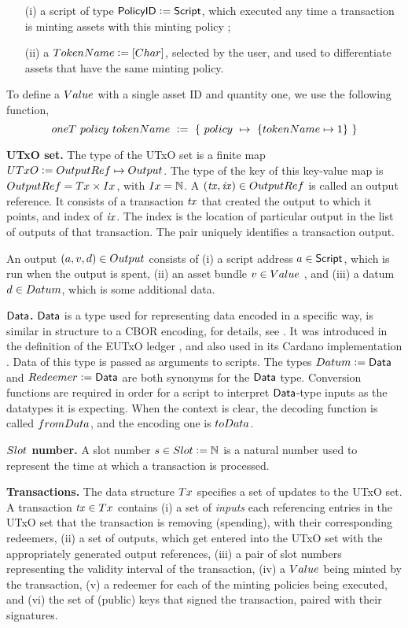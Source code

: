\begin{itemize}
  \item[(i)] a script of type $\textsf{PolicyID} \mathrel{\mathop:}= \textsf{Script}$, which executed any time a transaction is minting
  assets with this minting policy ;
  \item[(ii)] a $\TokenName \leteq [\type{Char}]$, selected by the user, and used to differentiate
  assets that have the same minting policy.
\end{itemize}

To define a $\Value$ with a single asset ID and quantity one, we use the following
function,
\[ \fun{oneT}~\fun{policy}~\fun{tokenName}~ \leteq~ \{~\fun{policy}~\mapsto~\{ \fun{tokenName} \mapsto 1 \}~\} \]

\textbf{UTxO set. } The type of the UTxO set is a finite map $\UTxO \leteq \OutputRef \mapsto \Output$.
The type of the key of this key-value map is $\OutputRef = \Tx \times \Ix$, with $\Ix = \N$.
A $(\var{tx}, \var{ix}) \in \OutputRef$ is called an output reference. It consists of a
transaction $\mathit{tx}$ that
created the output to which it points, and index of $\mathit{ix}$.
The index is the location of particular output in the list of outputs
of that transaction. The pair uniquely identifies a transaction
output.

An output $(a, v, d) \in \Output$ consists of (i) a script address $a \in \textsf{Script}$,
which is run when the output is spent, (ii) an asset bundle $v \in \Value$ , and
(iii) a datum $d \in \Datum$, which is some additional data.

\textbf{$\textsf{Data}$. } $\textsf{Data}$ is a type used for representing data encoded in a specific
way, is similar in structure to a CBOR encoding, for details, see \cite{agdaspeceutxo}.
It was introduced in the definition of
the EUTxO ledger \cite{eutxoma}, and also used in its Cardano implementation \cite{cardano}.
Data of this type is passed as arguments to scripts.
The types $\Datum \leteq \Data$ and $\Redeemer \leteq \Data$
are both synonyms for the $\textsf{Data}$ type. Conversion functions are required in order
for a script to interpret $\textsf{Data}$-type inputs as the datatypes it is expecting.
When the context is clear, the decoding
function is called $\fun{fromData}$, and the encoding one is $\fun{toData}$.

\textbf{$\Slot$ number. }  A slot number $s \in \Slot \leteq \N$ is a natural
number used to represent the time at which a transaction is processed.

\textbf{Transactions. } The data structure $\Tx$ specifies
a set of updates to the UTxO set. A transaction $\var{tx} \in \Tx$
contains (i) a set of \emph{inputs} each referencing entries in the UTxO set that the transaction
is removing (spending), with their corresponding redeemers, (ii) a set of outputs, which get entered into the
UTxO set with the appropriately generated output references, (iii) a pair of slot
numbers representing the validity interval of the transaction, (iv) a $\Value$ being
minted by the transaction, (v) a redeemer for each
of the minting policies being executed, and (vi) the set of (public) keys that signed the
transaction, paired with their signatures.

